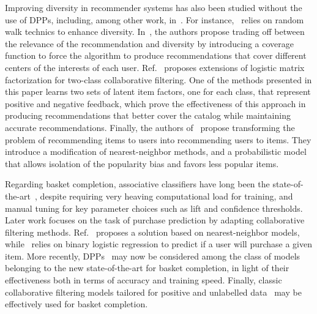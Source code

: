 Improving diversity in recommender systems has also been studied without the use
of DPPs, including, among other work,
in~\cite{Christoffel:2015:BWA:2792838.2800180,PuthiyaParambath:2016:CAR:2959100.2959149,Teo:2016:APD:2959100.2959171,Vargas:2014:ISD:2645710.2645744,Paudel:2017:FFT:3109859.3109916}.
For instance,~\cite{Christoffel:2015:BWA:2792838.2800180} relies on random walk
technics to enhance diversity.
In~\cite{PuthiyaParambath:2016:CAR:2959100.2959149}, the authors propose trading
off between the relevance of the recommendation and diversity by introducing a
coverage function to force the algorithm to produce recommendations that cover
different centers of the interests of each user.
Ref.~\cite{Paudel:2017:FFT:3109859.3109916} proposes extensions of logistic
matrix factorization for two-class collaborative filtering. One of the methods
presented in this paper learns two sets of latent item factors, one for each
class, that represent positive and negative feedback, which prove the
effectiveness of this approach in producing recommendations that better cover
the catalog while maintaining accurate recommendations. Finally, the authors
of~\cite{Vargas:2014:ISD:2645710.2645744} propose transforming the problem of
recommending items to users into recommending users to items. They introduce a
modification of nearest-neighbor methods, and a probabilistic model that allows
isolation of the popularity bias and favors less popular items. 

Regarding basket completion, associative classifiers have long been the
state-of-the-art~\cite{Agrawal:1993:MAR:170036.170072,Hipp:2000:AAR:360402.360421,Liu:1998:ICA:3000292.3000305}, despite requiring
very heaving computational load for training, and manual tuning for key
parameter choices such as lift and confidence thresholds. Later work focuses on
the task of purchase prediction by adapting collaborative filtering methods.
Ref.~\cite{Mild2003} proposes a solution based on nearest-neighbor models,
while~\cite{Lee:2005:CCF:1707421.1707525} relies on binary logistic regression
to predict if a user will purchase a given item. More recently,
DPPs~\cite{DBLP:conf/aaai/GartrellPK17,DBLP:conf/recsys/GartrellPK16} may now be
considered among the class of models belonging to the new state-of-the-art for
basket completion, in light of their effectiveness both in terms of accuracy and
training speed. Finally, classic collaborative filtering models tailored for
positive and unlabelled
data~\cite{Paquet:2013:OCF:2488388.2488475,Hu:2008:CFI:1510528.1511352,DBLP:journals/corr/GopalanHB13}
may be effectively used for basket completion.

